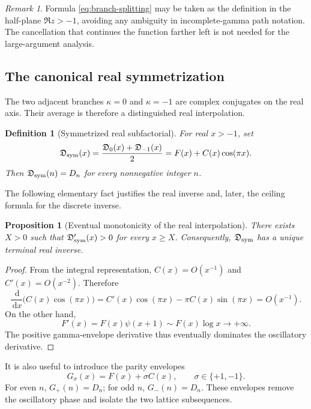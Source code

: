 \documentclass[11pt]{article}
\numberwithin{equation}{section}
\theoremstyle{mainthm}
\newtheorem{proposition}[theorem]{Proposition}
\theoremstyle{defstyle}
\newtheorem{definition}[theorem]{Definition}
\theoremstyle{remark}
\newtheorem{remark}[theorem]{Remark}
\newcommand{\dd}{\,\mathrm d}
\newcommand{\Dsub}{\mathfrak D}
\begin{document}
\begin{remark}
Formula \cref{eq:branch-splitting} may be taken as the definition in the half-plane \(\Re z>-1\), avoiding any ambiguity in incomplete-gamma path notation.  The cancellation that continues the function farther left is not needed for the large-argument analysis.
\end{remark}

\subsection{The canonical real symmetrization}

The two adjacent branches \(\kappa=0\) and \(\kappa=-1\) are complex conjugates on the real axis.  Their average is therefore a distinguished real interpolation.

\begin{definition}[Symmetrized real subfactorial]\label{def:sym-subfactorial}
For real \(x>-1\), set
\begin{equation}\label{eq:sym-subfactorial}
 \Dsub_{\rm sym}(x)
 =\frac{\Dsub_0(x)+\Dsub_{-1}(x)}2
 =F(x)+C(x)\cos(\pi x).
\end{equation}
Then \(\Dsub_{\rm sym}(n)=D_n\) for every nonnegative integer \(n\).
\end{definition}

The following elementary fact justifies the real inverse and, later, the ceiling formula for the discrete inverse.

\begin{proposition}[Eventual monotonicity of the real interpolation]\label{prop:sym-monotone}
There exists \(X>0\) such that \(\Dsub_{\rm sym}'(x)>0\) for every \(x\ge X\).  Consequently, \(\Dsub_{\rm sym}\) has a unique terminal real inverse.
\end{proposition}

\begin{proof}
From the integral representation,
\(
 C(x)=O(x^{-1})
\)
and
\(
 C'(x)=O(x^{-2})
\).
Therefore
\[
 \frac{\dd}{\dd x}\bigl(C(x)\cos(\pi x)\bigr)
 =C'(x)\cos(\pi x)-\pi C(x)\sin(\pi x)=O(x^{-1}).
\]
On the other hand,
\[
 F'(x)=F(x)\psi(x+1)\sim F(x)\log x\longrightarrow+\infty.
\]
The positive gamma-envelope derivative thus eventually dominates the oscillatory derivative.
\end{proof}

It is also useful to introduce the parity envelopes
\begin{equation}\label{eq:parity-envelopes}
 G_\sigma(x)=F(x)+\sigma C(x),\qquad \sigma\in\{+1,-1\}.
\end{equation}
For even \(n\), \(G_+(n)=D_n\); for odd \(n\), \(G_-(n)=D_n\).  These envelopes remove the oscillatory phase and isolate the two lattice subsequences.
\end{document}
